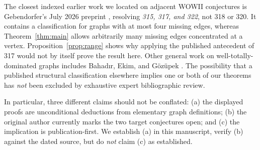 \documentclass[11pt,a4paper]{article}
\theoremstyle{definition}\newtheorem{definition}[theorem]{Definition}
\theoremstyle{remark}\newtheorem{remark}[theorem]{Remark}
\begin{document}
The closest indexed earlier work we located on adjacent WOWII conjectures is Gebendorfer's July 2026 preprint \cite{Gebendorfer2026}, resolving \emph{315, 317, and 322}, not 318 or 320. It contains a classification for graphs with at most four missing edges, whereas Theorem~\ref{thm:main} allows arbitrarily many missing edges concentrated at a vertex. Proposition~\ref{prop:range} shows why applying the published antecedent of 317 would not by itself prove the result here. Other general work on well-totally-dominated graphs includes Bahad\i r, Ekim, and G\"oz\"upek \cite{Bahadir2020}. The possibility that a published structural classification elsewhere implies one or both of our theorems has \emph{not} been excluded by exhaustive expert bibliographic review.

In particular, three different claims should not be conflated: (a) the displayed proofs are unconditional deductions from elementary graph definitions; (b) the original author currently marks the two target conjectures open; and (c) the implication is publication-first. We establish (a) in this manuscript, verify (b) against the dated source, but do \emph{not} claim (c) as established.
\end{document}
